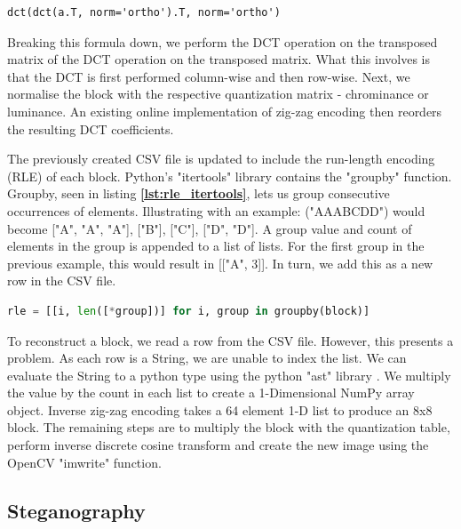 \documentclass{l4proj}
\begin{document}
\begin{verbatim}
dct(dct(a.T, norm='ortho').T, norm='ortho')
\end{verbatim}


Breaking this formula down, we perform the DCT operation on the transposed matrix of the DCT operation on the transposed matrix. What this involves is that the DCT is first performed column-wise and then row-wise. Next, we normalise the block with the respective quantization matrix - chrominance or luminance. An existing online implementation of zig-zag encoding \citep{lfv-compression} then reorders the resulting DCT coefficients.

The previously created CSV file is updated to include the run-length encoding (RLE) of each block. Python's "itertools" library contains the "groupby" function. Groupby, seen in listing \textbf{\ref{lst:rle_itertools}}, lets us group consecutive occurrences of elements. Illustrating with an example: ("AAABCDD") would become ["A", "A", "A"], ["B"], ["C"], ["D", "D"]. A group value and count of elements in the group is appended to a list of lists. For the first group in the previous example, this would result in [["A", 3]]. In turn, we add this as a new row in the CSV file.

\begin{lstlisting}[language=python, float, caption={Creation of Run-Length Encoding using Python's itertools library.}, label=lst:rle_itertools]
    rle = [[i, len([*group])] for i, group in groupby(block)]
\end{lstlisting}

To reconstruct a block, we read a row from the CSV file. However, this presents a problem. As each row is a String, we are unable to index the list. We can evaluate the String to a python type using the python "ast" library \citep{ast}.  We multiply the value by the count in each list to create a 1-Dimensional NumPy array object. Inverse zig-zag encoding takes a 64 element 1-D list to produce an 8x8 block. The remaining steps are to multiply the block with the quantization table, perform inverse discrete cosine transform and create the new image using the OpenCV "imwrite" function.

\subsection{Steganography}\label{joeg_steganography_implementation}
\end{document}
